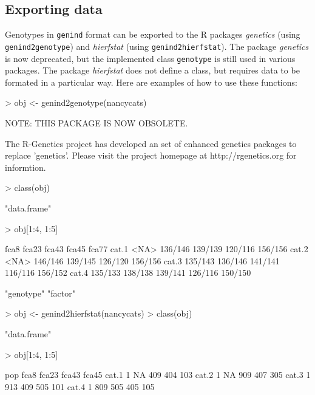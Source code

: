 \documentclass{article}
\begin{document}
\subsection{Exporting data}
Genotypes in \texttt{genind} format can be exported to the R packages
\emph{genetics} (using \texttt{genind2genotype}) and \emph{hierfstat} (using \texttt{genind2hierfstat}).
The package \emph{genetics} is now deprecated, but the implemented
class \texttt{genotype} is still used in various packages.
The package \emph{hierfstat} does not define a class, but requires
data to be formated in a particular way.
Here are examples of how to use these functions:
\begin{Schunk}
\begin{Sinput}
> obj <- genind2genotype(nancycats)
\end{Sinput}
\begin{Soutput}
NOTE: THIS PACKAGE IS NOW OBSOLETE.

  The R-Genetics project has developed an set of enhanced genetics
  packages to replace 'genetics'. Please visit the project homepage
  at http://rgenetics.org for informtion.
\end{Soutput}
\begin{Sinput}
> class(obj)
\end{Sinput}
\begin{Soutput}
[1] "data.frame"
\end{Soutput}
\begin{Sinput}
> obj[1:4, 1:5]
\end{Sinput}
\begin{Soutput}
         fca8   fca23   fca43   fca45   fca77
cat.1    <NA> 136/146 139/139 120/116 156/156
cat.2    <NA> 146/146 139/145 126/120 156/156
cat.3 135/143 136/146 141/141 116/116 156/152
cat.4 135/133 138/138 139/141 126/116 150/150
\end{Soutput}
\begin{Soutput}
[1] "genotype" "factor"  
\end{Soutput}
\end{Schunk}

\begin{Schunk}
\begin{Sinput}
> obj <- genind2hierfstat(nancycats)
> class(obj)
\end{Sinput}
\begin{Soutput}
[1] "data.frame"
\end{Soutput}
\begin{Sinput}
> obj[1:4, 1:5]
\end{Sinput}
\begin{Soutput}
      pop fca8 fca23 fca43 fca45
cat.1   1   NA   409   404   103
cat.2   1   NA   909   407   305
cat.3   1  913   409   505   101
cat.4   1  809   505   405   105
\end{Soutput}
\end{Schunk}
\end{document}
